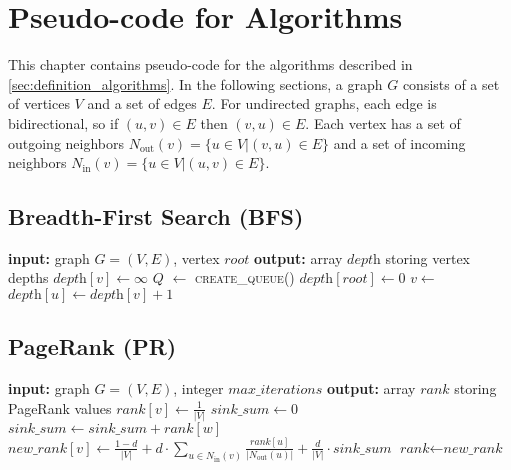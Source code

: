 \chapter{Pseudo-code for Algorithms}
\label{chap:algorithms}
This chapter contains pseudo-code for the algorithms described in \autoref{sec:definition_algorithms}. In the following sections, a graph $G$ consists of a set of vertices $V$ and a set of edges $E$. For undirected graphs, each edge is bidirectional, so if $(u, v) \in E$ then $(v, u) \in E$. Each vertex has a set of outgoing neighbors $N_\mathrm{out}(v) = \{u \in V | (v, u) \in E\}$ and a set of incoming neighbors $N_\mathrm{in}(v) = \{u \in V | (u, v) \in E\}$.

\section{Breadth-First Search (BFS)}

\begin{algorithm}[h!]
\begin{algorithmic}[1]
\Statex \textbf{input:} graph $G=(V,E)$, vertex $\textit{root}$
\Statex \textbf{output:} array $\textit{depth}$ storing vertex depths
  \State $\textit{depth}[v] \gets \infty$
\EndFor
\State $Q$ $\gets$  \textsc{create\_queue()}
\State {}
\State $\textit{depth}[\textit{root}] \gets 0$
  \State $v \gets $ 
      \State $\textit{depth}[u] \gets \textit{depth}[v] + 1$
      \State {}
    \EndIf
  \EndFor
\EndWhile
\end{algorithmic}
\end{algorithm}

\section{PageRank (PR)}

\begin{algorithm}[h!]
\begin{algorithmic}[1]
\Statex \textbf{input:} graph $G=(V,E)$, integer $\textit{max\_iterations}$
\Statex \textbf{output:} array $\textit{rank}$ storing PageRank values
  \State $\textit{rank}[v] \gets \frac{1}{|V|}$
\EndFor
{}
\State $\textit{sink\_sum} \gets 0$
    \State $\textit{sink\_sum} \gets \textit{sink\_sum} + \textit{rank}[w]$
  \EndIf
\EndFor
{}
  \State $\textit{new\_rank}[v] \gets \frac{1-d}{|V|} + d \cdot \sum_{u \in N_\mathrm{in}(v)} \frac{\textit{rank}[u]}{|N_\mathrm{out}(u)|} + \frac{d}{|V|} \cdot \textit{sink\_sum} $
\EndFor
\State $\textit{rank} \gets \textit{new\_rank}$
\EndFor
\end{algorithmic}
\end{algorithm}

